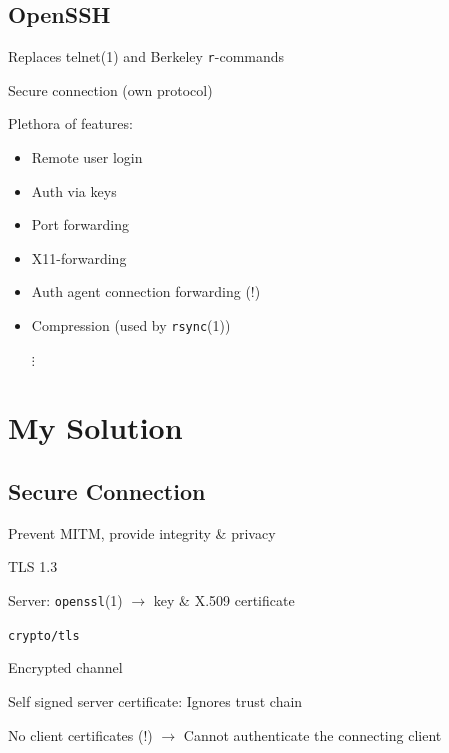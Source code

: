 \documentclass[
	xcolor=dvipsnames,
	handout
]{beamer}
\newenvironment{zhawframe}[1][]
{\begin{frame}[environment=fr,#1]{\insertsubsectionhead}{\insertsectionhead}}
{\end{frame}
}
\begin{document}
\subsection{OpenSSH}
\begin{zhawframe}
 Replaces telnet(1) and Berkeley \texttt{r}-commands

 Secure connection (own protocol)

 Plethora of features:
	\begin{itemize}
	\item<3-> Remote user login
	\item<3-> Auth via keys
	\item<3-> Port forwarding
	\item<3-> X11-forwarding
	\item<3-> Auth agent connection forwarding (!)
	\item<3-> Compression (used by \texttt{rsync}(1))

	\hspace{3mm}$\vdots$
	\end{itemize}
\end{zhawframe}

\section{My Solution}
\subsection{Secure Connection}
\begin{zhawframe}
 Prevent MITM, provide integrity \& privacy

 TLS 1.3

 Server: \texttt{openssl}(1) $\rightarrow$ key \& X.509 certificate

 \texttt{crypto/tls}

 Encrypted channel

 Self signed server certificate: Ignores trust chain

 No client certificates (!) $\rightarrow$ Cannot authenticate the connecting client
\end{zhawframe}
\end{document}
